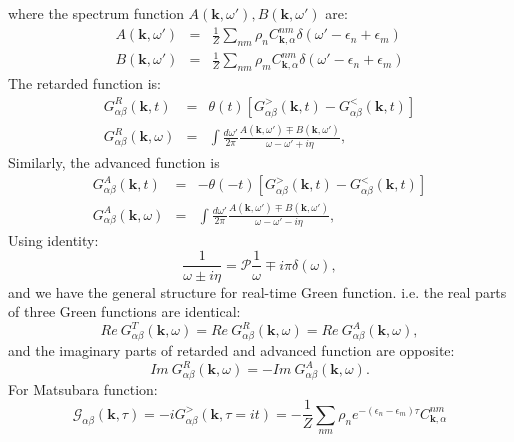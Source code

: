 \documentclass[journal=jacsat,manuscript=article]{achemso}
\begin{document}
where the spectrum function $A\left(\bm{k},\omega'\right), B\left(\bm{k},\omega'\right)$ are:
\begin{eqnarray}
	A\left(\bm{k},\omega'\right) & = & \frac{1}{Z}\sum_{nm}\rho_{n}C_{\bm{k},\alpha}^{nm}\delta\left(\omega'-\epsilon_{n}+\epsilon_{m}\right)\\
	B\left(\bm{k},\omega'\right) & = & \frac{1}{Z}\sum_{nm}\rho_{m}C_{\bm{k},\alpha}^{nm}\delta\left(\omega'-\epsilon_{n}+\epsilon_{m}\right)
\end{eqnarray}
The retarded function is:
\begin{eqnarray}
	G_{\alpha\beta}^{R}\left(\bm{k},t\right) & = & \theta\left(t\right)\left[G_{\alpha\beta}^{>}\left(\bm{k},t\right)-G_{\alpha\beta}^{<}\left(\bm{k},t\right)\right]\\
	G_{\alpha\beta}^{R}\left(\bm{k},\omega\right) & = & \int\frac{d\omega'}{2\pi}\frac{A\left(\bm{k},\omega'\right)\mp B\left(\bm{k},\omega'\right)}{\omega-\omega'+i\eta},
\end{eqnarray}
Similarly, the advanced function is
\begin{eqnarray}
	G_{\alpha\beta}^{A}\left(\bm{k},t\right) & = & -\theta\left(-t\right)\left[G_{\alpha\beta}^{>}\left(\bm{k},t\right)-G_{\alpha\beta}^{<}\left(\bm{k},t\right)\right]\\
	G_{\alpha\beta}^{A}\left(\bm{k},\omega\right) & = & \int\frac{d\omega'}{2\pi}\frac{A\left(\bm{k},\omega'\right)\mp B\left(\bm{k},\omega'\right)}{\omega-\omega'-i\eta},
\end{eqnarray}
Using identity:
\begin{equation}
	\frac{1}{\omega\pm i\eta}=\mathcal{P}\frac{1}{\omega}\mp i\pi\delta\left(\omega\right),
\end{equation}
and we have the general structure for real-time Green function. i.e. the real parts of three Green functions are identical: 
\begin{equation}
	Re\ G_{\alpha\beta}^{T}\left(\bm{k},\omega\right)=Re\ G_{\alpha\beta}^{R}\left(\bm{k},\omega\right)=Re\ G_{\alpha\beta}^{A}\left(\bm{k},\omega\right),
\end{equation}
and the imaginary parts of retarded and advanced function are opposite:
\begin{equation}
	Im\ G_{\alpha\beta}^{R}\left(\bm{k},\omega\right)=-Im\ G_{\alpha\beta}^{A}\left(\bm{k},\omega\right).
\end{equation}
For Matsubara function:
\begin{equation}
	\mathcal{G}_{\alpha\beta}\left(\bm{k},\tau\right) 
	=-iG_{\alpha\beta}^{>}\left(\bm{k},\tau=it\right)
 	=-\frac{1}{Z}\sum_{nm}\rho_{n}e^{-\left(\epsilon_{n}-\epsilon_{m}\right)\tau}C_{\bm{k},\alpha}^{nm}
\end{equation}
\end{document}

